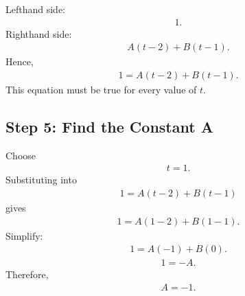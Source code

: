 \documentclass[letterpaper,10pt,english]{sphinxmanual}
\begin{document}
\sphinxAtStartPar
Left\sphinxhyphen{}hand side:
\begin{equation*}
\begin{split}1.\end{split}
\end{equation*}
\sphinxAtStartPar
Right\sphinxhyphen{}hand side:
\begin{equation*}
\begin{split}A(t-2)+B(t-1).\end{split}
\end{equation*}
\sphinxAtStartPar
Hence,
\begin{equation*}
\begin{split}1=A(t-2)+B(t-1).\end{split}
\end{equation*}
\sphinxAtStartPar
This equation must be true for every value of \(t\).


\subsection{Step 5: Find the Constant A}
\label{\detokenize{Language/Science_language/ODE_calculus/course_MATH_3035/homework_assignments/index_pdf:step-5-find-the-constant-a}}
\sphinxAtStartPar
Choose
\begin{equation*}
\begin{split}t=1.\end{split}
\end{equation*}
\sphinxAtStartPar
Substituting into
\begin{equation*}
\begin{split}1=A(t-2)+B(t-1)\end{split}
\end{equation*}
\sphinxAtStartPar
gives
\begin{equation*}
\begin{split}1=A(1-2)+B(1-1).\end{split}
\end{equation*}
\sphinxAtStartPar
Simplify:
\begin{equation*}
\begin{split}1=A(-1)+B(0).\end{split}
\end{equation*}\begin{equation*}
\begin{split}1=-A.\end{split}
\end{equation*}
\sphinxAtStartPar
Therefore,
\begin{equation*}
\begin{split}A=-1.\end{split}
\end{equation*}
\end{document}
